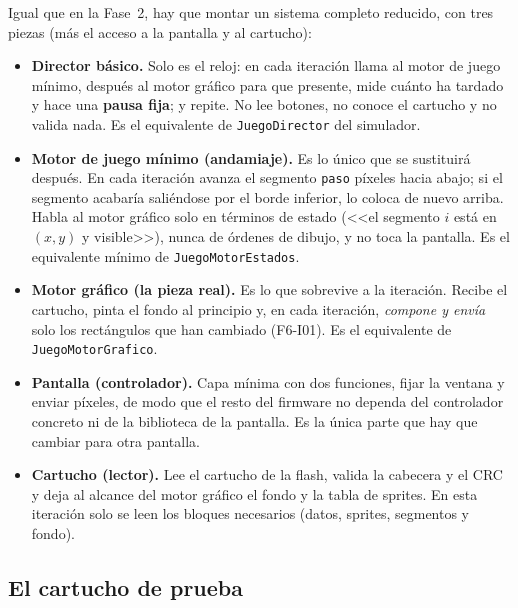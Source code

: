 Igual que en la Fase~2, hay que montar un sistema completo reducido, con tres piezas (más el acceso a la pantalla y al cartucho):

\begin{itemize}
	\item \textbf{Director básico.} Solo es el reloj: en cada iteración llama al motor de juego mínimo, después al motor gráfico para que presente, mide cuánto ha tardado y hace una \textbf{pausa fija}; y repite. No lee botones, no conoce el cartucho y no valida nada. Es el equivalente de \texttt{JuegoDirector} del simulador.
	\item \textbf{Motor de juego mínimo (andamiaje).} Es lo único que se sustituirá después. En cada iteración avanza el segmento \texttt{paso} píxeles hacia abajo; si el segmento acabaría saliéndose por el borde inferior, lo coloca de nuevo arriba. Habla al motor gráfico solo en términos de estado (<<el segmento $i$ está en $(x, y)$ y visible>>), nunca de órdenes de dibujo, y no toca la pantalla. Es el equivalente mínimo de \texttt{JuegoMotorEstados}.
	\item \textbf{Motor gráfico (la pieza real).} Es lo que sobrevive a la iteración. Recibe el cartucho, pinta el fondo al principio y, en cada iteración, \emph{compone y envía} solo los rectángulos que han cambiado (F6-I01). Es el equivalente de \texttt{JuegoMotorGrafico}.
	\item \textbf{Pantalla (controlador).} Capa mínima con dos funciones, fijar la ventana y enviar píxeles, de modo que el resto del firmware no dependa del controlador concreto ni de la biblioteca de la pantalla. Es la única parte que hay que cambiar para otra pantalla.
	\item \textbf{Cartucho (lector).} Lee el cartucho de la flash, valida la cabecera y el CRC y deja al alcance del motor gráfico el fondo y la tabla de sprites. En esta iteración solo se leen los bloques necesarios (datos, sprites, segmentos y fondo).
\end{itemize}

\subsection{El cartucho de prueba}
\label{sec:F6I02Cartucho}

